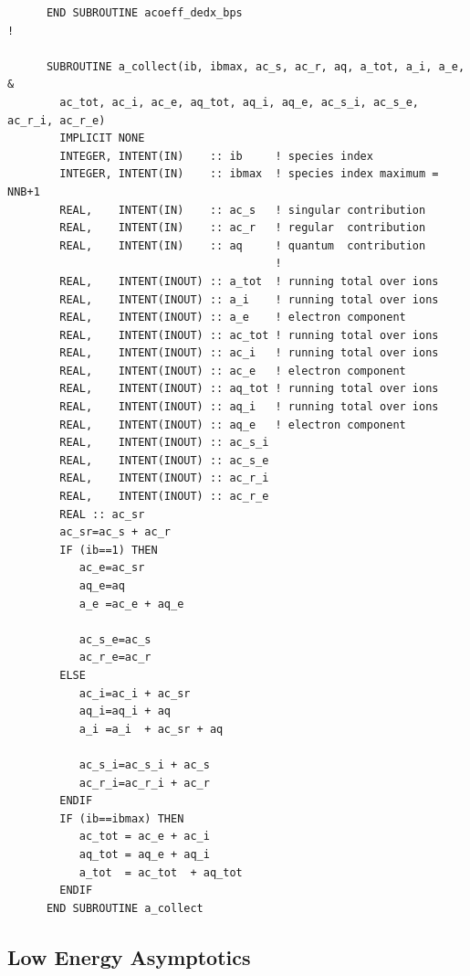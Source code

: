 \documentclass[preprint,12pt,eqsecnum,nofootinbib,amsmath,amssymb]{revtex4}
\begin{document}
{\begin{verbatim}
      END SUBROUTINE acoeff_dedx_bps
!

      SUBROUTINE a_collect(ib, ibmax, ac_s, ac_r, aq, a_tot, a_i, a_e, &
        ac_tot, ac_i, ac_e, aq_tot, aq_i, aq_e, ac_s_i, ac_s_e, ac_r_i, ac_r_e)
        IMPLICIT NONE
        INTEGER, INTENT(IN)    :: ib     ! species index
        INTEGER, INTENT(IN)    :: ibmax  ! species index maximum = NNB+1
        REAL,    INTENT(IN)    :: ac_s   ! singular contribution
        REAL,    INTENT(IN)    :: ac_r   ! regular  contribution
        REAL,    INTENT(IN)    :: aq     ! quantum  contribution
                                         !
        REAL,    INTENT(INOUT) :: a_tot  ! running total over ions
        REAL,    INTENT(INOUT) :: a_i    ! running total over ions
        REAL,    INTENT(INOUT) :: a_e    ! electron component
        REAL,    INTENT(INOUT) :: ac_tot ! running total over ions
        REAL,    INTENT(INOUT) :: ac_i   ! running total over ions
        REAL,    INTENT(INOUT) :: ac_e   ! electron component
        REAL,    INTENT(INOUT) :: aq_tot ! running total over ions
        REAL,    INTENT(INOUT) :: aq_i   ! running total over ions
        REAL,    INTENT(INOUT) :: aq_e   ! electron component
        REAL,    INTENT(INOUT) :: ac_s_i
        REAL,    INTENT(INOUT) :: ac_s_e
        REAL,    INTENT(INOUT) :: ac_r_i
        REAL,    INTENT(INOUT) :: ac_r_e
        REAL :: ac_sr
        ac_sr=ac_s + ac_r
        IF (ib==1) THEN
           ac_e=ac_sr
           aq_e=aq
           a_e =ac_e + aq_e

           ac_s_e=ac_s
           ac_r_e=ac_r
        ELSE
           ac_i=ac_i + ac_sr
           aq_i=aq_i + aq
           a_i =a_i  + ac_sr + aq

           ac_s_i=ac_s_i + ac_s
           ac_r_i=ac_r_i + ac_r
        ENDIF
        IF (ib==ibmax) THEN
           ac_tot = ac_e + ac_i
           aq_tot = aq_e + aq_i
           a_tot  = ac_tot  + aq_tot
        ENDIF
      END SUBROUTINE a_collect

\end{verbatim}
}


\subsection{Low Energy Asymptotics}
\end{document}
